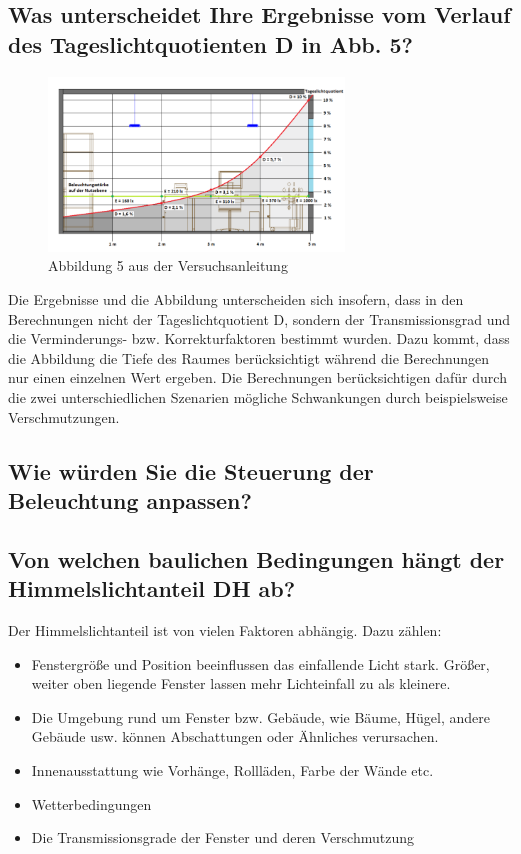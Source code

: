 \subsection{Was unterscheidet Ihre Ergebnisse vom Verlauf des Tageslichtquotienten D in Abb. 5?}


\begin{figure}[H]
    \centering
    \includegraphics[width=0.7\textwidth]{Abbildungen/abb5.png}
    \caption{Abbildung 5 aus der Versuchsanleitung }
    \label{fig:abb5}
\end{figure}

Die Ergebnisse und die Abbildung unterscheiden sich insofern, dass in den Berechnungen nicht der Tageslichtquotient D, sondern der Transmissionsgrad und die Verminderungs- bzw. Korrekturfaktoren bestimmt wurden.
Dazu kommt, dass die Abbildung die Tiefe des Raumes berücksichtigt während die Berechnungen nur einen einzelnen Wert ergeben. 
Die Berechnungen berücksichtigen dafür durch die zwei unterschiedlichen Szenarien mögliche Schwankungen durch beispielsweise Verschmutzungen.

\subsection{Wie würden Sie die Steuerung der Beleuchtung anpassen?}




\subsection{Von welchen baulichen Bedingungen hängt der Himmelslichtanteil DH ab?}

Der Himmelslichtanteil ist von vielen Faktoren abhängig. Dazu zählen:
\begin{itemize}
\item Fenstergröße und Position beeinflussen das einfallende Licht stark. Größer, weiter oben liegende Fenster lassen mehr Lichteinfall zu als kleinere. 
\item Die Umgebung rund um Fenster bzw. Gebäude, wie Bäume, Hügel, andere Gebäude usw. können Abschattungen oder Ähnliches verursachen.
\item Innenausstattung wie Vorhänge, Rollläden, Farbe der Wände etc. 
\item Wetterbedingungen
\item Die Transmissionsgrade der Fenster und deren Verschmutzung

\end{itemize}

